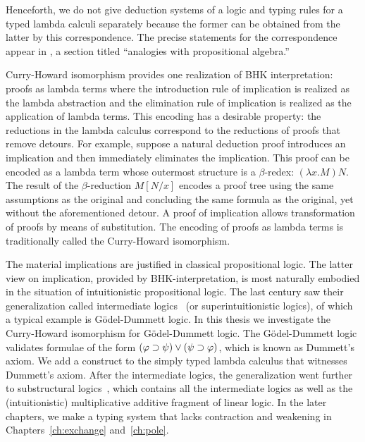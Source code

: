  Henceforth, we do not give deduction systems of a logic and
 typing rules for a typed lambda calculi separately because
 the former can be obtained from the latter by this correspondence.
The
precise statements for the correspondence appear in
\citet[9E]{curry1974combinatory}, a section titled ``analogies with
propositional algebra.''

Curry-Howard isomorphism provides
one realization of BHK interpretation: proofs as lambda terms where the
introduction rule of implication is realized as the lambda abstraction
and the elimination rule of implication is realized as the application
of lambda terms.
This encoding has a desirable property:
the reductions in the lambda calculus correspond to the reductions of
proofs that
remove detours.
For example, suppose a natural deduction proof introduces an implication and then
immediately eliminates the
implication.  This proof can be encoded as a lambda term whose outermost
structure is a $\beta$-redex: $(\lambda x. M)N$.
 The result of the $\beta$-reduction $M[N/x]$ encodes a proof tree using
 the same assumptions as the original and concluding the same formula as
 the original, yet without the aforementioned detour.
 A proof of implication allows transformation of proofs
by means of
substitution.  The encoding of proofs as lambda terms is traditionally
called the Curry-Howard isomorphism.

The material implications are justified in classical propositional logic.
The latter view on implication, provided by BHK-interpretation, is most
naturally embodied in the situation of
intuitionistic propositional logic.  The last century saw their
generalization called intermediate logics~\citep{umezawa} (or superintuitionistic
logics), of which a typical example is
G\"odel-Dummett logic.
In this thesis we investigate the Curry-Howard isomorphism for
G\"odel-Dummett logic.  The G\"odel-Dummett
logic validates formulae
of the form $(\varphi\supset\psi)\lor(\psi\supset\varphi)$, which is known as
Dummett's axiom.  We add a construct to the simply typed lambda
calculus
that witnesses Dummett's axiom.
After the intermediate logics, the generalization went further to
substructural
logics~\citep{residuated}, which contains all the intermediate logics as
well as the
(intuitionistic) multiplicative
additive fragment of linear logic.
In the later chapters, we make a typing system that lacks contraction and
weakening in Chapters~\ref{ch:exchange} and~\ref{ch:pole}.


